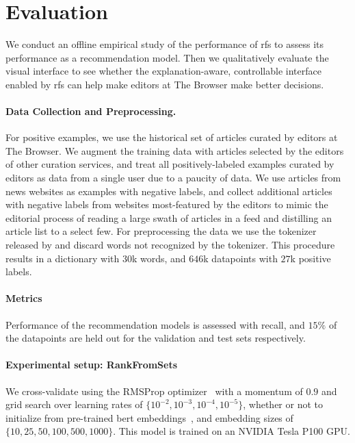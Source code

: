 \section{Evaluation}
\label{sec:experiments}

We conduct an offline empirical study of the performance of \acrlong{rfs} to assess its performance as a recommendation model. Then we qualitatively evaluate the visual interface to see whether the explanation-aware, controllable interface enabled by \gls{rfs} can help make editors at The Browser make better decisions.

\paragraph{Data Collection and Preprocessing.} For positive examples, we use the historical set of articles curated by editors at The Browser. We augment the training data with articles selected by the editors of other curation services, and treat all positively-labeled examples curated by editors as data from a single user due to a paucity of data. We use articles from news websites as examples with negative labels, and collect additional articles with negative labels from websites most-featured by the editors to mimic the editorial process of reading a large swath of articles in a feed and distilling an article list to a select few. For preprocessing the data we use the tokenizer released by \citet{devlin2019bert:} and discard words not recognized by the tokenizer. This procedure results in a dictionary with $30$k words, and $646$k datapoints with $27$k positive labels.

\paragraph{Metrics} Performance of the recommendation models is assessed with recall, and $15\%$ of the datapoints are held out for the validation and test sets respectively.

\paragraph{Experimental setup: RankFromSets} We cross-validate using the RMSProp optimizer~\citep{tieleman2012lecture} with a momentum of $0.9$ and grid search over learning rates of $\{10^{-2}, 10^{-3}, 10^{-4}, 10^{-5}\}$, whether or not to initialize from pre-trained \acrshort{bert} embeddings~\citep{wolf2019huggingfaces}, and embedding sizes of $\{10,25,50, 100, 500, 1000\}$. This model is trained on an NVIDIA Tesla P100 GPU.

